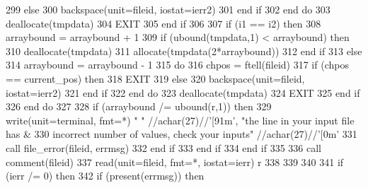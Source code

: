 \begin{DoxyCode}
299                 \textcolor{keywordflow}{else}
300                   backspace(unit=fileid, iostat=ierr2)
301 \textcolor{keywordflow}{                end if}
302 \textcolor{keywordflow}{              end do}
303               \textcolor{keyword}{deallocate}(tmpdata)
304               \textcolor{keywordflow}{EXIT}
305 \textcolor{keywordflow}{            end if}
306             
307             \textcolor{keywordflow}{if} (i1 == i2) \textcolor{keywordflow}{then}
308               arraybound = arraybound + 1
309               \textcolor{keywordflow}{if} (ubound(tmpdata,1) < arraybound) \textcolor{keywordflow}{then}
310                 \textcolor{keyword}{deallocate}(tmpdata)
311                 \textcolor{keyword}{allocate}(tmpdata(2*arraybound))
312 \textcolor{keywordflow}{              end if}    
313             \textcolor{keywordflow}{else} 
314               arraybound = arraybound - 1
315               \textcolor{keywordflow}{do}
316                 chpos = ftell(fileid)
317                 \textcolor{keywordflow}{if} (chpos == current\_pos) \textcolor{keywordflow}{then}
318                   \textcolor{keywordflow}{EXIT}
319                 \textcolor{keywordflow}{else}
320                   backspace(unit=fileid, iostat=ierr2)
321 \textcolor{keywordflow}{                end if}
322 \textcolor{keywordflow}{              end do}
323               \textcolor{keyword}{deallocate}(tmpdata)
324               \textcolor{keywordflow}{EXIT}
325 \textcolor{keywordflow}{            end if}
326 \textcolor{keywordflow}{          end do}
327   
328           \textcolor{keywordflow}{if} (arraybound /= ubound(r,1)) \textcolor{keywordflow}{then}
329             \textcolor{keyword}{write}(unit=terminal, fmt=*) \textcolor{stringliteral}{" "} //achar(27)//\textcolor{stringliteral}{'[91m'}, \textcolor{stringliteral}{"the line in your input file has &}
330 \textcolor{stringliteral}{}\textcolor{stringliteral}{               incorrect number of values, check your inputs"} //achar(27\textcolor{comment}{)//}\textcolor{stringliteral}{'[0m'}
331             \textcolor{keyword}{call }file_error(fileid, errmsg)
332 \textcolor{keywordflow}{         end if}
333 \textcolor{keywordflow}{        end if}
334 \textcolor{keywordflow}{      end if}
335       
336       \textcolor{keyword}{call }comment(fileid)
337       \textcolor{keyword}{read}(unit=fileid, fmt=*, iostat=ierr) r
338     
339       
340       
341       \textcolor{keywordflow}{if} (ierr /= 0) \textcolor{keywordflow}{then}
342         \textcolor{keywordflow}{if} (\textcolor{keyword}{present}(errmsg)) \textcolor{keywordflow}{then}

\end{DoxyCode}
